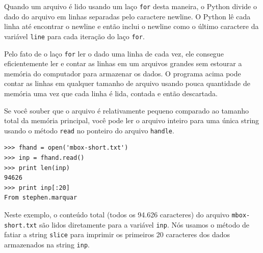 Quando um arquivo é lido usando um laço {\tt for} desta maneira, o Python
divide o dado do arquivo em linhas separadas pelo caractere newline.
O Python lê cada linha até encontrar o newline e então inclui o newline
como o último caractere da variável {\tt line} para cada iteração do 
laço {\tt for}. 

Pelo fato de o laço {\tt for} ler o dado uma linha de cada vez, ele
consegue eficientemente ler e contar as linhas em um arquivos grandes
sem estourar a memória do computador para armazenar os dados. O programa
acima pode contar as linhas em qualquer tamanho de arquivo usando pouca
quantidade de memória uma vez que cada linha é lida, contada e então
descartada. 

Se você souber que o arquivo é relativamente pequeno comparado ao 
tamanho total da memória principal, você pode ler o arquivo inteiro
para uma única string usando o método {\tt read} no ponteiro do arquivo
{\tt handle}.

\beforeverb
\begin{verbatim}
>>> fhand = open('mbox-short.txt')
>>> inp = fhand.read()
>>> print len(inp)
94626
>>> print inp[:20]
From stephen.marquar
\end{verbatim}
\afterverb

Neste exemplo, o conteúdo total (todos os 94.626 caracteres)
do arquivo {\tt mbox-short.txt} são lidos diretamente para a
variável {\tt inp}. Nós usamos o método de fatiar a string {\tt slice}
para imprimir os primeiros 20 caracteres dos dados armazenados na string
{\tt inp}.


